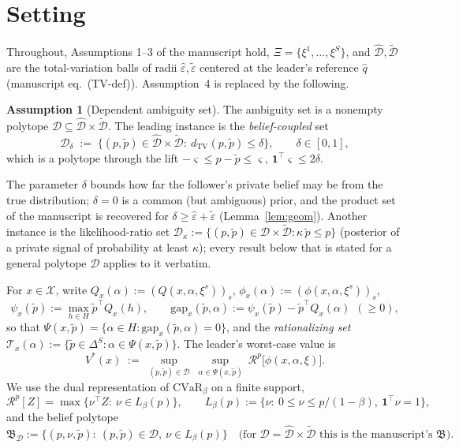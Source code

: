 \documentclass[11pt]{article}
\theoremstyle{definition}
\newtheorem{assumption}{Assumption}
\theoremstyle{remark}
\newcommand{\X}{\mathcal{X}}
\newcommand{\D}{\mathcal{D}}
\newcommand{\Dh}{\hat{\mathcal{D}}}
\newcommand{\Dt}{\tilde{\mathcal{D}}}
\newcommand{\tp}{\tilde{p}}
\newcommand{\heps}{\hat{\varepsilon}}
\newcommand{\teps}{\tilde{\varepsilon}}
\newcommand{\dtv}{d_{\mathrm{TV}}}
\newcommand{\B}{\mathfrak{B}}
\newcommand{\R}{\mathcal{R}}
\newcommand{\gap}{\mathrm{gap}}
\begin{document}
\section{Setting}

Throughout, Assumptions 1--3 of the manuscript hold, $\Xi=\{\xi^1,\dots,\xi^S\}$, and $\Dh,\Dt$ are the total-variation balls of radii $\heps,\teps$ centered at the leader's reference $\hat q$ (manuscript eq.~(TV-def)). Assumption~4 is replaced by the following.

\begin{assumption}[Dependent ambiguity set]\label{asm:dep}
The ambiguity set is a nonempty polytope $\D\subseteq\Dh\times\Dt$. The leading instance is the \emph{belief-coupled} set
\begin{equation}\label{eq:Ddelta}
  \D_\delta \;:=\; \big\{(p,\tp)\in\Dh\times\Dt:\ \dtv(p,\tp)\le\delta\big\},\qquad \delta\in[0,1],
\end{equation}
which is a polytope through the lift $-\varsigma\le p-\tp\le\varsigma$, $\mathbf 1^\top\varsigma\le 2\delta$.
\end{assumption}

The parameter $\delta$ bounds how far the follower's private belief may be from the true distribution; $\delta=0$ is a common (but ambiguous) prior, and the product set of the manuscript is recovered for $\delta\ge\heps+\teps$ (Lemma~\ref{lem:geom}). Another instance is the likelihood-ratio set $\D_\kappa:=\{(p,\tp)\in\Dh\times\Dt:\kappa\,\tp\le p\}$ (posterior of a private signal of probability at least $\kappa$); every result below that is stated for a general polytope $\D$ applies to it verbatim.

For $x\in\X$, write $Q_x(\alpha):=(Q(x,\alpha,\xi^s))_{s}$, $\phi_x(\alpha):=(\phi(x,\alpha,\xi^s))_{s}$,
\[
  \psi_x(\tp):=\max_{h\in H}\tp^\top Q_x(h),\qquad
  \gap_x(\tp,\alpha):=\psi_x(\tp)-\tp^\top Q_x(\alpha)\ \ (\ge 0),
\]
so that $\Psi(x,\tp)=\{\alpha\in H:\gap_x(\tp,\alpha)=0\}$,
and the \emph{rationalizing set} $\mathcal{T}_x(\alpha):=\{\tp\in\Delta^S:\alpha\in\Psi(x,\tp)\}$. The leader's worst-case value is
\begin{equation}\label{eq:Vstar}
  V^*(x)\;:=\;\sup_{(p,\tp)\in\D}\ \sup_{\alpha\in\Psi(x,\tp)}\ \R^p\big[\phi(x,\alpha,\xi)\big].
\end{equation}
We use the dual representation of $\mathrm{CVaR}_\beta$ on a finite support,
\begin{equation}\label{eq:cvar-dual}
  \R^p[Z]=\max\big\{\nu^\top Z:\ \nu\in L_\beta(p)\big\},\qquad L_\beta(p):=\{\nu:\ 0\le\nu\le p/(1-\beta),\ \mathbf 1^\top\nu=1\},
\end{equation}
and the belief polytope
\begin{equation}\label{eq:BD}
  \B_\D:=\big\{(p,\nu,\tp):\ (p,\tp)\in\D,\ \nu\in L_\beta(p)\big\}
  \quad\Big(\text{for }\D=\Dh\times\Dt\text{ this is the manuscript's }\B\Big).
\end{equation}
\end{document}
